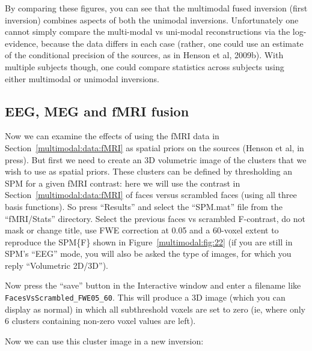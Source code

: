 By comparing these figures, you can see that the multimodal fused inversion (first inversion) combines aspects of both the unimodal inversions. Unfortunately one cannot simply compare the multi-modal vs uni-modal reconstructions via the log-evidence, because the data differs in each case (rather, one could use an estimate of the conditional precision of the sources, as in Henson et al, 2009b). With multiple subjects though, one could compare statistics across subjects using either multimodal or unimodal inversions.

\subsection{EEG, MEG and fMRI fusion \label{multimodal:fusion:fmri}}

Now we can examine the effects of using the fMRI data in Section~\ref{multimodal:data:fMRI} as spatial priors on the sources (Henson et al, in press). But first we need to create an 3D volumetric image of the clusters that we wish to use as spatial priors. These clusters can be defined by thresholding an SPM for a given fMRI contrast: here we will use the contrast in Section~\ref{multimodal:data:fMRI} of faces versus scrambled faces (using all three basis functions). So press ``Results'' and select the ``SPM.mat'' file from the ``fMRI/Stats'' directory. Select the previous faces vs scrambled F-contrast, do not mask or change title, use FWE correction at 0.05 and a 60-voxel extent to reproduce the SPM\{F\} shown in Figure~\ref{multimodal:fig:22} (if you are still in SPM's ``EEG'' mode, you will also be asked the type of images, for which you reply ``Volumetric 2D/3D'').

Now press the ``save'' button in the Interactive window and enter a filename like \texttt{Faces\-Vs\-Scrambled\_FWE05\_60}. This will produce a 3D image (which you can display as normal) in which all subthreshold voxels are set to zero (ie, where only 6 clusters containing non-zero voxel values are left).

Now we can use this cluster image in a new inversion:

